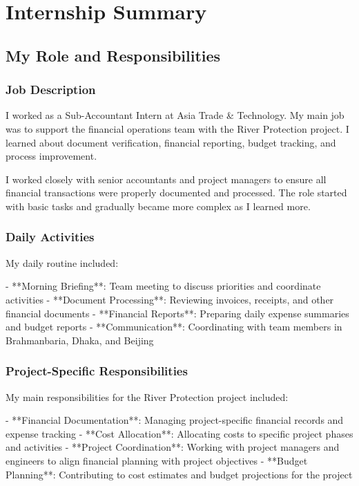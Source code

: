 
\chapter{Internship Summary}

\section{My Role and Responsibilities}

\subsection{Job Description}
I worked as a Sub-Accountant Intern at Asia Trade \& Technology. My main job was to support the financial operations team with the River Protection project. I learned about document verification, financial reporting, budget tracking, and process improvement.

I worked closely with senior accountants and project managers to ensure all financial transactions were properly documented and processed. The role started with basic tasks and gradually became more complex as I learned more.

\vspace{0.3em}
\subsection{Daily Activities}
My daily routine included:

- **Morning Briefing**: Team meeting to discuss priorities and coordinate activities
- **Document Processing**: Reviewing invoices, receipts, and other financial documents
- **Financial Reports**: Preparing daily expense summaries and budget reports
- **Communication**: Coordinating with team members in Brahmanbaria, Dhaka, and Beijing

\subsection{Project-Specific Responsibilities}
My main responsibilities for the River Protection project included:

- **Financial Documentation**: Managing project-specific financial records and expense tracking
- **Cost Allocation**: Allocating costs to specific project phases and activities
- **Project Coordination**: Working with project managers and engineers to align financial planning with project objectives
- **Budget Planning**: Contributing to cost estimates and budget projections for the project

